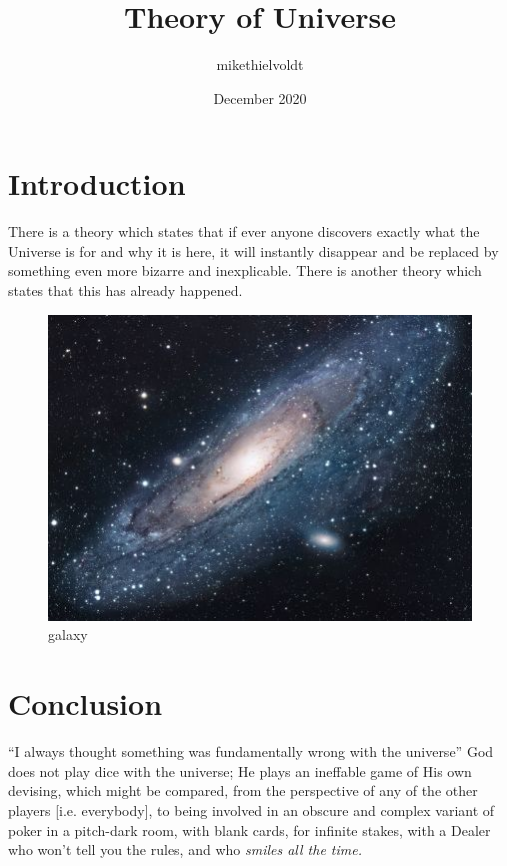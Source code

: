 \documentclass{article}
\title{Theory of Universe}
\author{mikethielvoldt }
\date{December 2020}
\begin{document}
\maketitle

\section{Introduction}
There is a theory which states that if ever anyone discovers exactly what the Universe is for and why it is here, it will instantly disappear and be replaced by something even more bizarre and inexplicable.
There is another theory which states that this has already happened.



\begin{figure}[h!]
\centering
\includegraphics[scale=1.7]{galaxy}
\caption{galaxy}
\label{fig:galaxy}
\end{figure}

\section{Conclusion}
``I always thought something was fundamentally wrong with the universe'' \citep{adams1995hitchhiker}\newline
\newline
God does not play dice with the universe; He plays an ineffable game of His own devising, which might be compared, from the perspective of any of the other players [i.e. everybody], to being involved in an obscure and complex variant of poker in a pitch-dark room, with blank cards, for infinite stakes, with a Dealer who won't tell you the rules, and who \em{smiles all the time}.



\end{document}
